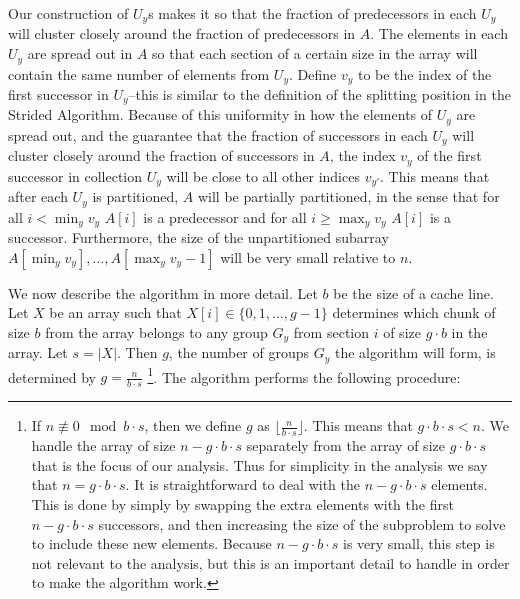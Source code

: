\documentclass[sigconf]{acmart}
\renewcommand{\paragraph}[1]{\vspace{0.09in}\noindent{\bf \boldmath #1.}}
\theoremstyle{remark}
\theoremstyle{remark}
\begin{document}
Our construction of $U_y$s makes it so that the fraction of predecessors in each $U_y$ will cluster closely around the fraction of predecessors in $A$.
The elements in each $U_y$ are spread out in $A$ so that each section of a certain size in the array will contain the same number of elements from $U_y$. 
Define $v_y$ to be the index of the first successor in $U_y$--this is similar to the definition of the splitting position in the Strided Algorithm.
Because of this uniformity in how the elements of $U_y$ are spread out, and the guarantee that the fraction of successors in each $U_y$ will cluster closely around the fraction of successors in $A$, the index $v_y$ of the first successor in collection $U_y$ will be close to all other indices $v_{y'}$.
This means that after each $U_y$ is partitioned, $A$ will be partially partitioned, in the sense that for all $i < \min_y{v_y}$ $A[i]$ is a predecessor and for all $i \ge \max_y{v_y}$ $A[i]$ is a successor.
Furthermore, the size of the unpartitioned subarray $A[\min_y{v_y}],\ldots,A[\max_y{v_y}-1]$ will be very small relative to $n$. 

\paragraph{Algorithm Description}
We now describe the algorithm in more detail.
Let $b$ be the size of a cache line.
Let $X$ be an array such that $X[i] \in \{0,1,\ldots,g-1\}$ determines which chunk of size $b$ from the array belongs to any group $G_y$ from section $i$ of size $g\cdot b$ in the array.
Let $s = |X|$.
Then $g$, the number of groups $G_y$ the algorithm will form, is determined by $g=\frac{n}{b\cdot s}$
\footnote{If $n \not\equiv 0 \mod b\cdot s$, then we define $g$ as $\Big\lfloor \frac{n}{b\cdot s}\Big\rfloor $. 
This means that $g\cdot b \cdot s < n$. 
We handle the array of size $n-g\cdot b \cdot s$ separately from the array of size $g\cdot b \cdot s$ that is the focus of our analysis.
Thus for simplicity in the analysis we say that $n=g\cdot b\cdot s$.
It is straightforward to deal with the $n-g\cdot b\cdot s$ elements.
This is done by simply by swapping the extra elements with the first $n-g\cdot b\cdot s$ successors, and then increasing the size of the subproblem to solve to include these new elements.
Because $n-g\cdot b\cdot s$ is very small, this step is not relevant to the analysis, but this is an important detail to handle in order to make the algorithm work. }.
The algorithm performs the following procedure:
\end{document}

